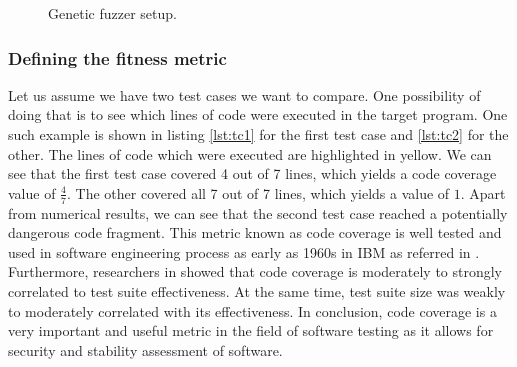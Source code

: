 \begin{figure}[h!]
    \centering


    \caption{Genetic fuzzer setup.}
    \label{fig:genetic_fuzz}
\end{figure}

\subsubsection{Defining the fitness metric}
Let us assume we have two test cases we want to compare. One possibility of doing that is to see which lines of code were executed in the target program. One such example is shown in listing \ref{lst:tc1} for the first test case and \ref{lst:tc2} for the other. The lines of code which were executed are highlighted in yellow. We can see that the first test case covered 4 out of 7 lines, which yields a code coverage value of $\frac{4}{7}$. The other covered all 7 out of 7 lines, which yields a value of $1$. Apart from numerical results, we can see that the second test case reached a potentially dangerous code fragment. This metric known as code coverage is well tested and used in software engineering process as early as 1960s in IBM as referred in \cite{ibm_coverage}. Furthermore, researchers in \cite{coverage} showed that code coverage is moderately to strongly correlated to test suite effectiveness. At the same time, test suite size was weakly to moderately correlated with its effectiveness. In conclusion, code coverage is a very important and useful metric in the field of software testing as it allows for security and stability assessment of software.

